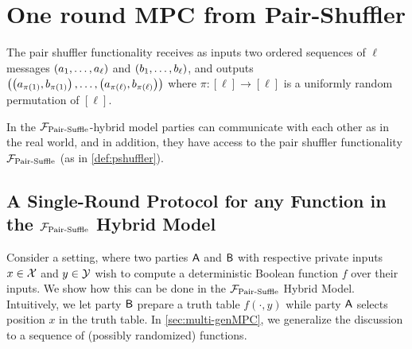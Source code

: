 \section{One round MPC from Pair-Shuffler}
\begin{definition}\label{def:pshuffler}
The pair shuffler functionality receives as inputs two ordered sequences of $\ell$ messages $\left(a_1, \ldots, a_\ell\right)$ and $\left(b_1, \ldots, b_\ell\right)$, and outputs $\left(\left(a_{\pi(1)},b_{\pi(1)}\right), \ldots, \left(a_{\pi(\ell)},b_{\pi(\ell)}\right)\right)$ where $\pi:[\ell]\rightarrow [\ell]$ is a uniformly random permutation of $[\ell]$. 
\end{definition}

\begin{definition}
In the ${\cal F}_{\operatorname{Pair-Suffle}}$-hybrid model parties can communicate with each other as in the real world, and in addition, they have access to the pair shuffler functionality ${\cal F}_{\operatorname{Pair-Suffle}}$ (as in \cref{def:pshuffler}). 
\end{definition}

\subsection{A Single-Round Protocol for any Function in the ${\cal F}_{\operatorname{Pair-Suffle}}$ Hybrid Model}\label{sec:genMPC}

Consider a setting, where two parties $\mathsf{A}$  and $\mathsf{B}$ with respective private inputs $x\in\mathcal{X}$ and $y\in\mathcal{Y}$ wish to compute a deterministic Boolean function $f$ over their inputs.
We show how this can be done in the ${\cal F}_{\operatorname{Pair-Suffle}}$ Hybrid Model. Intuitively, we let party $\mathsf{B}$ prepare a truth table $f(\cdot,y)$ while party $\mathsf{A}$ selects position $x$ in the truth table. In \cref{sec:multi-genMPC}, we generalize the discussion to a sequence of (possibly randomized) functions.

